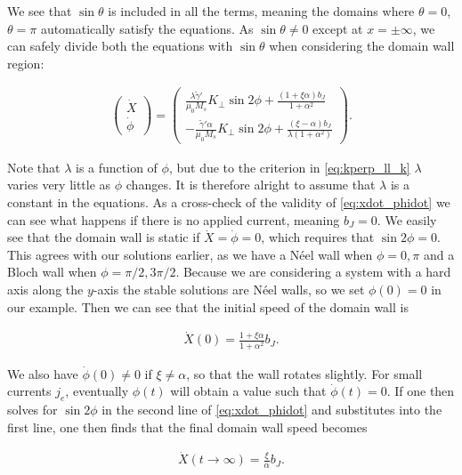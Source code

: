 \documentclass[1p]{elsarticle}		%
\numberwithin{equation}{section}
\begin{document}
We see that $\sin\theta$ is included in all the terms, meaning the domains where $\theta = 0$, $\theta = \pi$ automatically satisfy the equations. As $\sin\theta \neq 0$ except at $x = \pm \infty$, we can safely divide both the equations with $\sin\theta$ when considering the domain wall region:

\begin{align}
\label{eq:xdot_phidot}
\begin{pmatrix}
\dot{X} \\ \dot{\phi}
\end{pmatrix}
=
\begin{pmatrix}
\frac{\lambda \tilde{\gamma}'}{\mu_0 M_s} K_{\perp} \sin2\phi + \frac{(1+\xi\alpha)b_J}{1+\alpha^2} \\
-\frac{\tilde{\gamma}'\alpha}{\mu_0 M_s} K_{\perp} \sin2\phi + \frac{(\xi-\alpha)b_J}{\lambda(1+\alpha^2)}
\end{pmatrix}.
\end{align}

Note that $\lambda$ is a function of $\phi$, but due to the criterion in \eqref{eq:kperp_ll_k} $\lambda$ varies very little as $\phi$ changes. It is therefore alright to assume that $\lambda$ is a constant in the equations. As a cross-check of the validity of \eqref{eq:xdot_phidot} we can see what happens if there is no applied current, meaning $b_J = 0$. We easily see that the domain wall is static if $\dot{X} = \dot{\phi} = 0$, which requires that $\sin2\phi = 0$. This agrees with our solutions earlier, as we have a N\'{e}el wall when $\phi = 0, \pi$ and a Bloch wall when $\phi = \pi/2, 3\pi/2$. Because we are considering a system with a hard axis along the $y$-axis the stable solutions are N\'{e}el walls, so we set $\phi(0) = 0$ in our example. Then we can see that the initial speed of the domain wall is

\begin{align}
\label{eq:Xdot0}
\dot{X}(0) = \frac{1+\xi\alpha}{1+\alpha^2}b_J.
\end{align}

We also have $\dot{\phi}(0) \neq 0$ if $\xi \neq \alpha$, so that the wall rotates slightly. For small currents $j_e$, eventually $\phi(t)$ will obtain a value such that $\dot{\phi}(t) = 0$. If one then solves for $\sin2\phi$ in the second line of \eqref{eq:xdot_phidot} and substitutes into the first line, one then finds that the final domain wall speed becomes

\begin{align}
\label{eq:xdot_undercrit}
\dot{X}(t\rightarrow\infty) = \frac{\xi}{\alpha} b_J.
\end{align}
\end{document}
